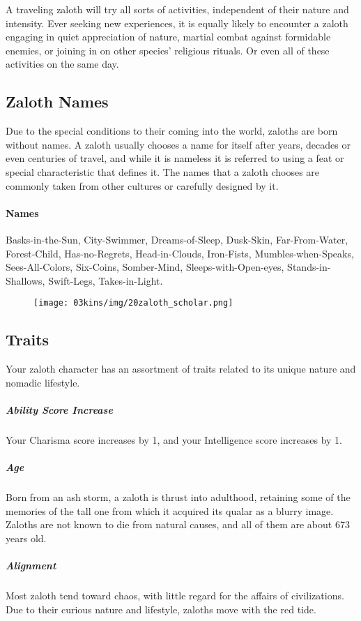 A traveling zaloth will try all sorts of activities, independent of their nature and intensity.
Ever seeking new experiences, it is equally likely to encounter a zaloth engaging in quiet appreciation of nature, martial combat against formidable enemies, or joining in on other species' religious rituals.
Or even all of these activities on the same day.

\subsection*{Zaloth Names}
Due to the special conditions to their coming into the world, zaloths are born without names.
A zaloth usually chooses a name for itself after years, decades or even centuries of travel, and while it is nameless it is referred to using a feat or special characteristic that defines it.
The names that a zaloth chooses are commonly taken from other cultures or carefully designed by it.

\paragraph{Names} Basks-in-the-Sun, City-Swimmer, Dreams-of-Sleep, Dusk-Skin, Far-From-Water, Forest-Child, Has-no-Regrets, Head-in-Clouds, Iron-Fists, Mumbles-when-Speaks, Sees-All-Colors, Six-Coins, Somber-Mind, Sleeps-with-Open-eyes, Stands-in-Shallows, Swift-Legs, Takes-in-Light.

\begin{figure}[!t]
    \centering
    \texttt{[image: 03kins/img/20zaloth\_scholar.png]}
\end{figure}

\subsection*{Traits}
Your zaloth character has an assortment of traits related to its unique nature and nomadic lifestyle.

\subparagraph{Ability Score Increase} Your Charisma score increases by 1, and your Intelligence score increases by 1.

\subparagraph{Age} Born from an ash storm, a zaloth is thrust into adulthood, retaining some of the memories of the tall one from which it acquired its qualar as a blurry image.
Zaloths are not known to die from natural causes, and all of them are about 673 years old.

\subparagraph{Alignment} Most zaloth tend toward chaos, with little regard for the affairs of civilizations.
Due to their curious nature and lifestyle, zaloths move with the red tide.

